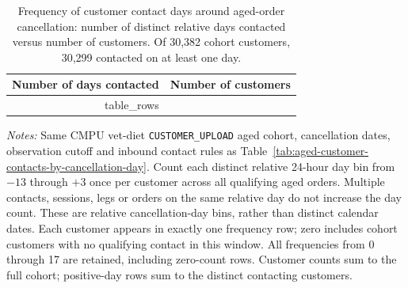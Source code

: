 \begin{table}[!htbp]
\centering
\caption{Frequency of customer contact days around aged-order cancellation: number of distinct relative days contacted versus number of customers. Of 30,382 cohort customers, 30,299 contacted on at least one day.}
\label{tab:aged-customer-contact-day-frequency}
\begin{tabular}{@{}rr@{}}
\toprule
Number of days contacted & Number of customers \\
\midrule
{{ table_rows }}
\bottomrule
\end{tabular}

\begin{minipage}{\linewidth}
\footnotesize
\textit{Notes:} Same CMPU vet-diet \texttt{CUSTOMER\_UPLOAD} aged cohort,
cancellation dates, observation cutoff and inbound contact rules as
Table~\ref{tab:aged-customer-contacts-by-cancellation-day}.
Count each distinct relative 24-hour day bin from $-13$ through $+3$ once
per customer across all qualifying aged orders. Multiple contacts, sessions,
legs or orders on the same relative day do not increase the day count.
These are relative cancellation-day bins, rather than distinct calendar dates.
Each customer appears in exactly one frequency row; zero includes cohort
customers with no qualifying contact in this window. All frequencies from
0 through 17 are retained, including zero-count rows. Customer counts sum to
the full cohort; positive-day rows sum to the distinct contacting customers.
\end{minipage}
\end{table}
